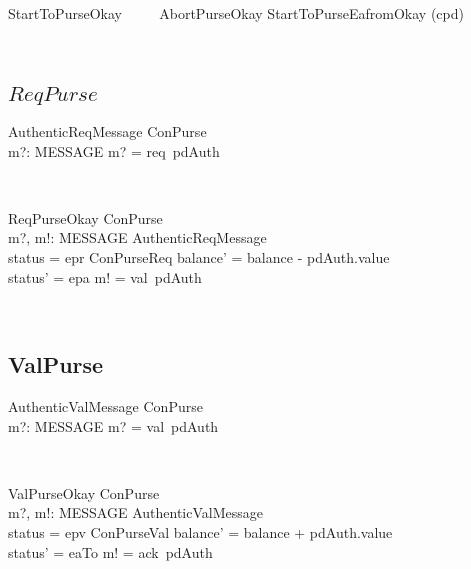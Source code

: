 \begin{LSDef}
\begin{zed}
   StartToPurseOkay ~~~~ AbortPurseOkay \semi StartToPurseEafromOkay \hide (cpd)
\end{zed}~\end{LSDef}

\pagebreak
\subsection{$ReqPurse$}

\begin{LSDef}
\begin{schema}{AuthenticReqMessage}
   ConPurse \\
   m?: MESSAGE
\where
   m? = req~pdAuth
\end{schema}~\end{LSDef}

\begin{LSDef}
\begin{schema}{ReqPurseOkay}
   \Delta ConPurse \\
   m?, m!: MESSAGE
\where
   AuthenticReqMessage \\
   status = epr
   \also
   \Xi ConPurseReq
   \also
   balance' = balance - pdAuth.value \\
   status' = epa
   \also
   m! = val~pdAuth
\end{schema}~\end{LSDef}

\subsection{ValPurse}

\begin{LSDef}
\begin{schema}{AuthenticValMessage}
   ConPurse \\
   m?: MESSAGE
\where
   m? = val~pdAuth
\end{schema}~\end{LSDef}

\begin{LSDef}
\begin{schema}{ValPurseOkay}
   \Delta ConPurse \\
   m?, m!: MESSAGE
\where
   AuthenticValMessage \\
   status = epv
   \also
   \Xi ConPurseVal
   \also
   balance' = balance + pdAuth.value \\
   status' = eaTo
   \also
   m! = ack~pdAuth
\end{schema}~\end{LSDef}

